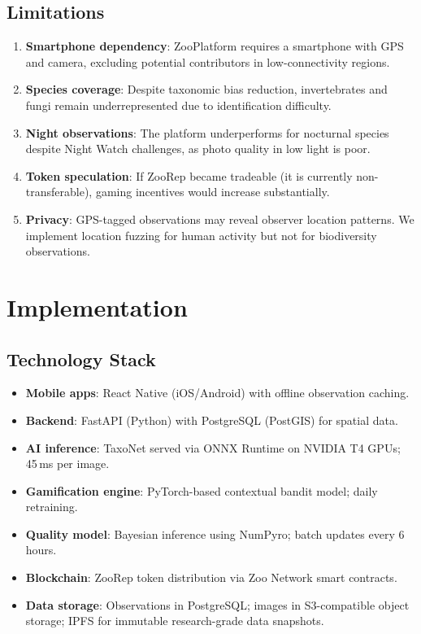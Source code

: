 \documentclass[11pt,a4paper]{article}
\begin{document}
\subsection{Limitations}

\begin{enumerate}
  \item \textbf{Smartphone dependency}: ZooPlatform requires a
    smartphone with GPS and camera, excluding potential contributors
    in low-connectivity regions.
  \item \textbf{Species coverage}: Despite taxonomic bias reduction,
    invertebrates and fungi remain underrepresented due to
    identification difficulty.
  \item \textbf{Night observations}: The platform underperforms for
    nocturnal species despite Night Watch challenges, as photo quality
    in low light is poor.
  \item \textbf{Token speculation}: If ZooRep became tradeable (it is
    currently non-transferable), gaming incentives would increase
    substantially.
  \item \textbf{Privacy}: GPS-tagged observations may reveal observer
    location patterns. We implement location fuzzing for human activity
    but not for biodiversity observations.
\end{enumerate}


\section{Implementation}
\label{sec:implementation}

\subsection{Technology Stack}

\begin{itemize}
  \item \textbf{Mobile apps}: React Native (iOS/Android) with offline
    observation caching.
  \item \textbf{Backend}: FastAPI (Python) with PostgreSQL (PostGIS) for
    spatial data.
  \item \textbf{AI inference}: TaxoNet served via ONNX Runtime on
    NVIDIA T4 GPUs; 45\,ms per image.
  \item \textbf{Gamification engine}: PyTorch-based contextual bandit
    model; daily retraining.
  \item \textbf{Quality model}: Bayesian inference using NumPyro;
    batch updates every 6 hours.
  \item \textbf{Blockchain}: ZooRep token distribution via Zoo Network
    smart contracts.
  \item \textbf{Data storage}: Observations in PostgreSQL; images in
    S3-compatible object storage; IPFS for immutable research-grade
    data snapshots.
\end{itemize}
\end{document}

